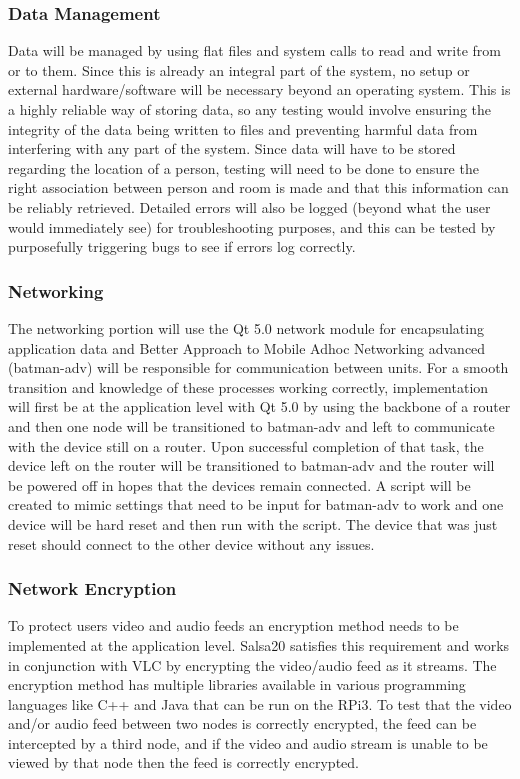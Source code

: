 \documentclass[onecolumn, draftclsnofoot,10pt, compsoc]{IEEEtran}
\begin{document}
\subsubsection{Data Management}
Data will be managed by using flat files and system calls to read and write from or to them. Since this is already an integral part of the system, no setup or external hardware/software will be necessary beyond an operating system. This is a highly reliable way of storing data, so any testing would involve ensuring the integrity of the data being written to files and preventing harmful data from interfering with any part of the system. Since data will have to be stored regarding the location of a person, testing will need to be done to ensure the right association between person and room is made and that this information can be reliably retrieved. Detailed errors will also be logged (beyond what the user would immediately see) for troubleshooting purposes, and this can be tested by purposefully triggering bugs to see if errors log correctly. 

\subsubsection{Networking}
The networking portion will use the Qt 5.0 network module for encapsulating application data and Better Approach to Mobile Adhoc Networking advanced (batman-adv) will be responsible for communication between units. For a smooth transition and knowledge of these processes working correctly, implementation will first be at the application level with Qt 5.0 by using the backbone of a router and then one node will be transitioned to batman-adv and left to communicate with the device still on a router. Upon successful completion of that task, the device left on the router will be transitioned to batman-adv and the router will be powered off in hopes that the devices remain connected. A script will be created to mimic settings that need to be input for batman-adv to work and one device will be hard reset and then run with the script. The device that was just reset should connect to the other device without any issues.

\subsubsection{Network Encryption}
To protect users video and audio feeds an encryption method needs to be implemented at the application level.
Salsa20 satisfies this requirement and works in conjunction with VLC by encrypting the video/audio feed as it streams. The encryption method has multiple libraries available in various programming languages like C++ and Java that can be run on the RPi3. 
To test that the video and/or audio feed between two nodes is correctly encrypted, the feed can be intercepted by a third node, and if the video and audio stream is unable to be viewed by that node then the feed is correctly encrypted.
\end{document}

